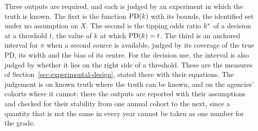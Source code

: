 Three outputs are required, and each is judged by an experiment in which the truth is known. The first is the function $\mathrm{PD}(k)$ with its bounds, the identified set under no assumption on $X$. The second is the tipping odds ratio $k^{*}$ of a decision at a threshold $t$, the value of $k$ at which $\mathrm{PD}(k)=t$. The third is an anchored interval for $\pi$ when a second source is available, judged by its coverage of the true PD, its width and the bias of its centre. For the decision use, the interval is also judged by whether it lies on the right side of a threshold. These are the measures of Section~\ref{sec:experimental-design}, stated there with their equations. The judgement is on known truth where the truth can be known, and on the agencies' cohorts where it cannot: there the outputs are reported with their assumptions and checked for their stability from one annual cohort to the next, since a quantity that is not the same in every year cannot be taken as one number for the grade.
